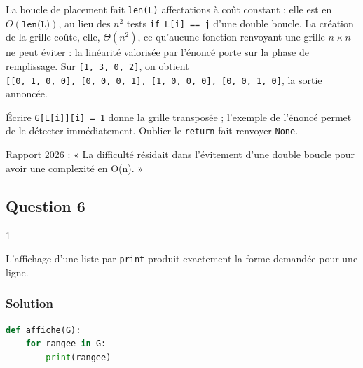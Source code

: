 \documentclass[11pt,a4paper]{article}
\begin{document}
La boucle de placement fait \texttt{len(L)} affectations à coût constant : elle est en \(O(\texttt{len(L)})\), au lieu des \(n^2\) tests \texttt{if\ L{[}i{]}\ ==\ j} d'une double boucle. La création de la grille coûte, elle, \(\Theta(n^2)\), ce qu'aucune fonction renvoyant une grille \(n \times n\) ne peut éviter : la linéarité valorisée par l'énoncé porte sur la phase de remplissage. Sur \texttt{{[}1,\ 3,\ 0,\ 2{]}}, on obtient \texttt{{[}{[}0,\allowbreak{}\ 1,\allowbreak{}\ 0,\allowbreak{}\ 0{]}\allowbreak{},\allowbreak{}\ {[}0,\allowbreak{}\ 0,\allowbreak{}\ 0,\allowbreak{}\ 1{]}\allowbreak{},\allowbreak{}\ {[}1,\allowbreak{}\ 0,\allowbreak{}\ 0,\allowbreak{}\ 0{]}\allowbreak{},\allowbreak{}\ {[}0,\allowbreak{}\ 0,\allowbreak{}\ 1,\allowbreak{}\ 0{]}\allowbreak{}{]}\allowbreak{}}, la sortie annoncée.

\begin{piege}

Écrire \texttt{G{[}L{[}i{]}{]}{[}i{]}\ =\ 1} donne la grille transposée ; l'exemple de l'énoncé permet de le détecter immédiatement. Oublier le \texttt{return} fait renvoyer \texttt{None}.

\end{piege}

\begin{jury}

Rapport 2026 : « La difficulté résidait dans l'évitement d'une double boucle pour avoir une complexité en O(n). »

\end{jury}

\hypertarget{question-6}{%
\subsection{Question 6}\label{question-6}}

\begin{indication}{1}

L'affichage d'une liste par \texttt{print} produit exactement la forme demandée pour une ligne.

\end{indication}

\hypertarget{solution-5}{%
\subsubsection{Solution}\label{solution-5}}

\begin{lstlisting}[language=Python]
def affiche(G):
    for rangee in G:
        print(rangee)
\end{lstlisting}
\end{document}
